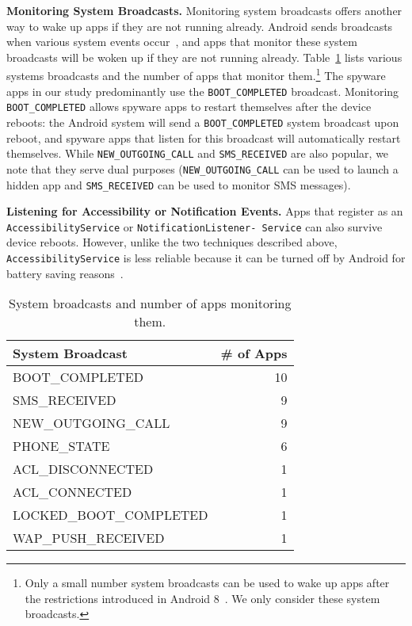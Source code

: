 \documentclass[sigconf,balance=false]{acmart}
\begin{document}
\textbf{Monitoring System Broadcasts.} Monitoring system broadcasts offers another way to wake up apps if they are not running already. Android sends broadcasts when various system events occur~\cite{Broadcas25:online}, and apps that monitor these system broadcasts will be woken up if they are not running already. Table~\ref{tab:monitor_broadcast} lists various systems broadcasts and the number of apps that monitor them.\footnote{Only a small number system broadcasts can be used to wake up apps after the restrictions introduced in Android 8~\cite{Implicit72:online}. We only consider these system broadcasts.} The spyware apps in our study predominantly use the \texttt{BOOT\_COMPLETED} broadcast. Monitoring
\texttt{BOOT\_COMPLETED} allows spyware apps to restart themselves
after the device reboots: the Android system will send a
\texttt{BOOT\_COMPLETED} system broadcast upon reboot, and spyware apps that listen
for this broadcast will automatically restart themselves. While \texttt{NEW\_OUTGOING\_CALL} and \texttt{SMS\_RECEIVED} are also popular, we note that they serve dual purposes (\texttt{NEW\_OUTGOING\_CALL} can be used to launch a hidden app and \texttt{SMS\_RECEIVED} can be used to monitor SMS messages).

\textbf{Listening for Accessibility or Notification Events.} Apps that register as an
\texttt{AccessibilityService} or
\texttt{NotificationListener- Service}
can also survive device
reboots. However, unlike the two techniques described above,
\texttt{AccessibilityService}
is less reliable because it can be
turned off by Android for battery saving reasons~\cite{AndroidA0:online,Accessib46:online}.


\begin{table}[t]
  \begin{tabular}{lr}
    System Broadcast         &\# of Apps  \\
    \midrule
    BOOT\_COMPLETED          &10          \\
    SMS\_RECEIVED            &9           \\
    NEW\_OUTGOING\_CALL      &9           \\
    PHONE\_STATE             &6           \\
    ACL\_DISCONNECTED        &1           \\
    ACL\_CONNECTED           &1           \\
    LOCKED\_BOOT\_COMPLETED  &1           \\
    WAP\_PUSH\_RECEIVED      &1           \\
  \end{tabular}
  \caption{System broadcasts and number of apps monitoring them.\label{tab:monitor_broadcast}}
\end{table}
\end{document}
